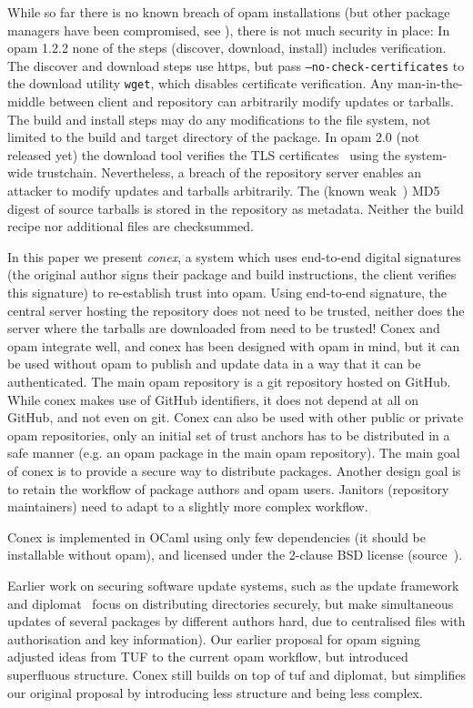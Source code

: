 \documentclass[nocopyrightspace]{sigplanconf}
\begin{document}
While so far there is no known breach of opam installations (but other package managers have been compromised, see \cite{cabal,maven,npm,rubygems}), there is not much security in place:
In opam 1.2.2 none of the steps (discover, download, install) includes verification.
The discover and download steps use https, but pass \texttt{--no-check-certificates} to the download utility \texttt{wget}, which disables certificate verification.
Any man-in-the-middle between client and repository can arbitrarily modify updates or tarballs.
The build and install steps may do any modifications to the file system, not limited to the build and target directory of the package.
In opam 2.0 (not released yet) the download tool verifies the TLS certificates~\cite{opampr} using the system-wide trustchain.
Nevertheless, a breach of the repository server enables an attacker to modify updates and tarballs arbitrarily.
The (known weak~\cite{rfc6151}) MD5 digest of source tarballs is stored in the repository as metadata.
Neither the build recipe nor additional files are checksummed.

In this paper we present \emph{conex}, a system which uses end-to-end digital signatures (the original author signs their package and build instructions, the client verifies this signature) to re-establish trust into opam.
Using end-to-end signature, the central server hosting the repository does not need to be trusted, neither does the server where the tarballs are downloaded from need to be trusted!
Conex and opam integrate well, and conex has been designed with opam in mind, but it can be used without opam to publish and update data in a way that it can be authenticated.
The main opam repository is a git repository hosted on GitHub.
While conex makes use of GitHub identifiers, it does not depend at all on GitHub, and not even on git.
Conex can also be used with other public or private opam repositories, only an initial set of trust anchors has to be distributed in a safe manner (e.g. an opam package in the main opam repository).
The main goal of conex is to provide a secure way to distribute packages.
Another design goal is to retain the workflow of package authors and opam users.
Janitors (repository maintainers) need to adapt to a slightly more complex workflow.

Conex is implemented in OCaml using only few dependencies (it should be installable without opam), and licensed under the 2-clause BSD license (source~\cite{conex}).

Earlier work on securing software update systems, such as the update framework~\cite{tuf} and diplomat~\cite{diplomat} focus on distributing directories securely, but make simultaneous updates of several packages by different authors hard, due to centralised files with authorisation and key information).
Our earlier proposal for opam signing~\cite{opamsigning} adjusted ideas from TUF to the current opam workflow, but introduced superfluous structure.
Conex still builds on top of tuf and diplomat, but simplifies our original proposal by introducing less structure and being less complex.
\end{document}

